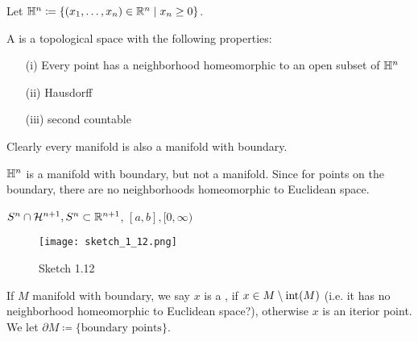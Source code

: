 Let \(\mathbb{H}^n\coloneqq \{(x_1,\dots,x_n)\in\mathbb{R}^n\mid x_n\geq 0\}\).
\begin{definition*}
    A  is a topological space with the following properties:
    \begin{enumerate}
        \item[(i)] Every point has a neighborhood homeomorphic to an open subset of \(\mathbb{H}^n\)
        \item[(ii)] Hausdorff
        \item[(iii)] second countable   
    \end{enumerate}
\end{definition*}

Clearly every manifold is also a manifold with boundary.

\begin{example}
    \(\mathbb{H}^n\) is a manifold with boundary, but not a manifold. Since for points on the boundary, there are no neighborhoods homeomorphic to Euclidean space.
\end{example}

\begin{example}
    \(S^n\cap \mathcal{H}^{n+1},S^n\subset\mathbb{R}^{n+1}\), \([a,b],[0,\infty)\)
    \begin{figure}[H]
        \centering
        \texttt{[image: sketch\_1\_12.png]}
        \caption{Sketch 1.12}
    \end{figure}
\end{example}

\begin{definition*}
    If \(M\) manifold with boundary, we say \(x\) is a , if \(x\in M\setminus\text{int}(M)\) (i.e. it has no neighborhood homeomorphic to Euclidean space?), otherwise \(x\) is an iterior point. We let \(\partial M \coloneqq \{\text{boundary points}\}\).
\end{definition*}

